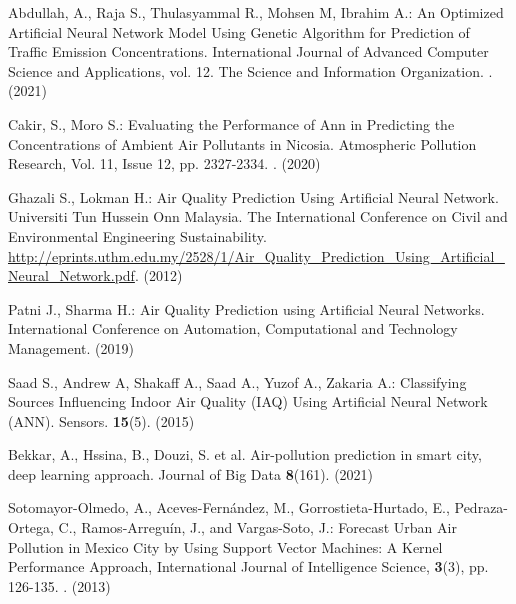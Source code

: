 \documentclass{llncs}
\begin{document}
\begin{thebibliography}{8}
    
    Abdullah, A., Raja S., Thulasyammal R.,  Mohsen M, Ibrahim A.: An Optimized Artificial Neural Network Model Using Genetic Algorithm for Prediction of Traffic Emission Concentrations. International Journal of Advanced Computer Science and Applications, vol. 12. The Science and Information Organization. . (2021)
    
    Cakir, S., Moro S.: Evaluating the Performance of Ann in Predicting the Concentrations of Ambient Air Pollutants in Nicosia. Atmospheric Pollution Research, Vol. 11, Issue 12, pp. 2327-2334. . (2020)
    
    Ghazali S., Lokman H.: Air Quality Prediction Using Artificial Neural Network. Universiti Tun Hussein Onn Malaysia. The International Conference on Civil and Environmental Engineering Sustainability. \url{http://eprints.uthm.edu.my/2528/1/Air_Quality_Prediction_Using_Artificial_Neural_Network.pdf}. (2012)
    
    
    Patni J., Sharma H.: Air Quality Prediction using Artificial Neural Networks. International Conference on Automation, Computational and Technology Management.  (2019)
    
    
    Saad S., Andrew A, Shakaff A., Saad A., Yuzof A., Zakaria A.: Classifying Sources Influencing Indoor Air Quality (IAQ) Using Artificial Neural Network (ANN). Sensors. \textbf{15}(5). (2015)
    
    Bekkar, A., Hssina, B., Douzi, S. et al. Air-pollution prediction in smart city, deep learning approach. Journal of Big Data \textbf{8}(161). 
    (2021)
    
    Sotomayor-Olmedo, A., Aceves-Fernández, M., Gorrostieta-Hurtado, E., Pedraza-Ortega, C., Ramos-Arreguín, J., and Vargas-Soto, J.: Forecast Urban Air Pollution in Mexico City by Using Support Vector Machines: A Kernel Performance Approach, International Journal of Intelligence Science, \textbf{3}(3), pp. 126-135. .
    (2013)
    

\end{thebibliography}
\end{document}
